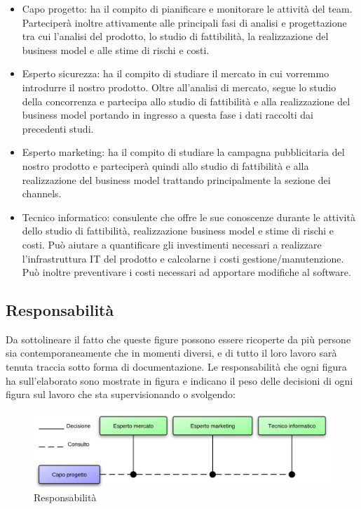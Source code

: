 \vspace*{0.5cm}

\begin{itemize}

\item Capo progetto: ha il compito di pianificare e monitorare le attività del team. Parteciperà inoltre attivamente alle principali fasi di analisi e progettazione tra cui l'analisi del prodotto, lo studio di fattibilità, la realizzazione del business model e alle stime di rischi e costi.

\item Esperto sicurezza: ha il compito di studiare il mercato in cui vorremmo introdurre il nostro prodotto. Oltre all'analisi di mercato, segue lo studio della concorrenza e partecipa allo studio di fattibilità e alla realizzazione del business model portando in ingresso a questa fase i dati raccolti dai precedenti studi. 

\item Esperto marketing: ha il compito di studiare la campagna pubblicitaria del nostro prodotto e parteciperà quindi allo studio di fattibilità e alla realizzazione del business model trattando principalmente la sezione dei channels.

\item Tecnico informatico: consulente che offre le sue conoscenze durante le attività dello studio di fattibilità, realizzazione business model e stime di rischi e costi. Può aiutare a quantificare gli investimenti necessari a realizzare l'infrastruttura IT del prodotto e calcolarne i costi gestione/manutenzione. Può inoltre preventivare i costi necessari ad apportare modifiche al software.

\end{itemize}

\subsection{Responsabilità}
Da sottolineare il fatto che queste figure possono essere ricoperte da più persone sia contemporaneamente che in momenti diversi, e di tutto il loro lavoro sarà tenuta traccia sotto forma di documentazione.
Le responsabilità che ogni figura ha sull'elaborato sono mostrate in figura  e indicano il peso delle decisioni di ogni figura sul lavoro che sta supervisionando o svolgendo:

\vspace*{0.5cm}

\begin{figure}[H]
\centering
\includegraphics[scale=0.8]{images/cap3/resp.png}
\caption{Responsabilità}
\end{figure}

